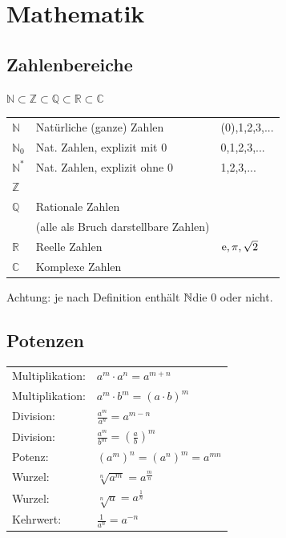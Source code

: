 \section{Mathematik}

\subsection{Zahlenbereiche}

	\begin{emphbox}

	$\mathbb{N} \subset \mathbb{Z} \subset \mathbb{Q} \subset \mathbb{R} \subset \mathbb{C} $

		\begin{tabular}{lll}
			$\mathbb{N} $& Natürliche (ganze) Zahlen & (0),1,2,3,... \\
			$\mathbb{N}_0 $& Nat. Zahlen, explizit mit 0 & 0,1,2,3,...  \\
			$\mathbb{N}^\ast $& Nat. Zahlen, explizit ohne 0 & 1,2,3,... \\
			$\mathbb{Z}$ \\
			$\mathbb{Q}$ & Rationale Zahlen & \\
			& (alle als Bruch darstellbare Zahlen) & \\
			$\mathbb{R}$ & Reelle Zahlen & $\mathrm{e}, \pi, \sqrt 2 $\\
			$\mathbb{C}$ & Komplexe Zahlen & 
		\end{tabular}
	\end{emphbox}

	Achtung: je nach Definition enthält $\operatorname{\mathbb N} $die 0 oder nicht.

\subsection{Potenzen}

	\begin{emphbox}
		\begin{tabular}{ll}

		Multiplikation: & $ a^m \cdot a^n = a^{m+n} $ \\
		Multiplikation: & $ a^m \cdot b^m = (a \cdot b)^m $ \\
		Division: & $ \frac{a^m}{a^n} = a^{m-n} $ \\
		Division: & $ \frac{a^m}{b^m} = (\frac{a}{b})^m $ \\
		Potenz: & $ (a^m)^n = (a^n)^m = a^{mn} $ \\
		Wurzel: & $ \sqrt[n]{a^m} = a^\frac{m}{n} $ \\
		Wurzel: & $ \sqrt[n]{a} = a^\frac{1}{n} $ \\
		Kehrwert: & $ \frac{1}{a^n} = a^{-n} $ \\
		\end{tabular}
	\end{emphbox}






